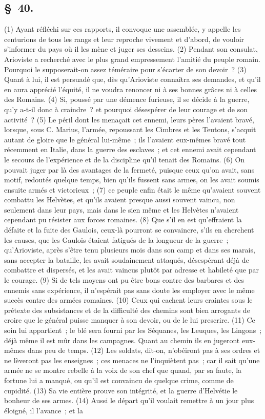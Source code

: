 \documentclass[french,twoside]{book} %
\begin{document}
\subsection[{§ 40.}]{ \textsc{§ 40.} }
\noindent (1) Ayant réfléchi sur ces rapports, il convoque une assemblée, y appelle les centurions de tous les rangs et leur reproche vivement et d’abord, de vouloir s’informer du pays où il les mène et juger ses desseins. (2) Pendant son consulat, Arioviste a recherché avec le plus grand empressement l’amitié du peuple romain. Pourquoi le supposerait-on assez téméraire pour s’écarter de son devoir ? (3) Quant à lui, il est persuadé que, dès qu’Arioviste connaîtra ses demandes, et qu’il en aura apprécié l’équité, il ne voudra renoncer ni à ses bonnes grâces ni à celles des Romains. (4) Si, poussé par une démence furieuse, il se décide à la guerre, qu’y a-t-il donc à craindre ? et pourquoi désespérer de leur courage et de son activité ? (5) Le péril dont les menaçait cet ennemi, leurs pères l’avaient bravé, lorsque, sous C. Marius, l’armée, repoussant les Cimbres et les Teutons, s’acquit autant de gloire que le général lui-même ; ils l’avaient eux-mêmes bravé tout récemment en Italie, dans la guerre des esclaves ; et cet ennemi avait cependant le secours de l’expérience et de la discipline qu’il tenait des Romains. (6) On pouvait juger par là des avantages de la fermeté, puisque ceux qu’on avait, sans motif, redoutés quelque temps, bien qu’ils fussent sans armes, on les avait soumis ensuite armés et victorieux ; (7) ce peuple enfin était le même qu’avaient souvent combattu les Helvètes, et qu’ils avaient presque aussi souvent vaincu, non seulement dans leur pays, mais dans le sien même et les Helvètes n’avaient cependant pu résister aux forces romaines. (8) Que s’il en est qu’effraient la défaite et la fuite des Gaulois, ceux-là pourront se convaincre, s’ils en cherchent les causes, que les Gaulois étaient fatigués de la longueur de la guerre ; qu’Arioviste, après s’être tenu plusieurs mois dans son camp et dans ses marais, sans accepter la bataille, les avait soudainement attaqués, désespérant déjà de combattre et dispersés, et les avait vaincus plutôt par adresse et habileté que par le courage. (9) Si de tels moyens ont pu être bons contre des barbares et des ennemis sans expérience, il n’espérait pas sans doute les employer avec le même succès contre des armées romaines. (10) Ceux qui cachent leurs craintes sous le prétexte des subsistances et de la difficulté des chemins sont bien arrogants de croire que le général puisse manquer à son devoir, ou de le lui prescrire. (11) Ce soin lui appartient ; le blé sera fourni par les Séquanes, les Leuques, les Lingons ; déjà même il est mûr dans les campagnes. Quant au chemin ils en jugeront eux-mêmes dans peu de temps. (12) Les soldats, dit-on, n’obéiront pas à ses ordres et ne lèveront pas les enseignes ; ces menaces ne l’inquiètent pas ; car il sait qu’une armée ne se montre rebelle à la voix de son chef que quand, par sa faute, la fortune lui a manqué, ou qu’il est convaincu de quelque crime, comme de cupidité. (13) Sa vie entière prouve son intégrité, et la guerre d’Helvétie le bonheur de ses armes. (14) Aussi le départ qu’il voulait remettre à un jour plus éloigné, il l’avance ; et la 
\end{document}
